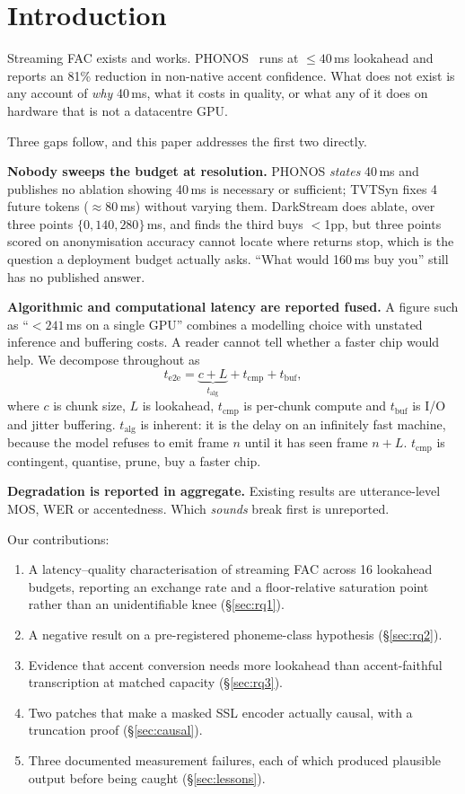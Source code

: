 \documentclass[9pt,a4paper,twocolumn]{article}
\newcommand{\talg}{\ensuremath{t_{\mathrm{alg}}}}
\newcommand{\tcmp}{\ensuremath{t_{\mathrm{cmp}}}}
\newcommand{\tbuf}{\ensuremath{t_{\mathrm{buf}}}}
\begin{document}
\section{Introduction}

Streaming FAC exists and works. PHONOS~\cite{phonos2026} runs at
${\leq}40$\,ms lookahead and reports an 81\% reduction in non-native accent
confidence. What does not exist is any account of \emph{why} 40\,ms, what it
costs in quality, or what any of it does on hardware that is not a datacentre
GPU.

Three gaps follow, and this paper addresses the first two directly.

\textbf{Nobody sweeps the budget at resolution.} PHONOS \emph{states} 40\,ms
and publishes no ablation showing 40\,ms is necessary or sufficient; TVTSyn
fixes 4 future tokens ($\approx$80\,ms) without varying them. DarkStream does
ablate, over three points $\{0, 140, 280\}$\,ms, and finds the third buys
$<$1pp, but three points scored on anonymisation accuracy cannot locate
where returns stop, which is the question a deployment budget actually asks.
``What would 160\,ms buy you'' still has no published answer.

\textbf{Algorithmic and computational latency are reported fused.} A figure
such as ``${<}241$\,ms on a single GPU'' combines a modelling choice with
unstated inference and buffering costs. A reader cannot tell whether a faster
chip would help. We decompose throughout as
\begin{equation}
t_{\mathrm{e2e}} = \underbrace{c + L}_{t_{\mathrm{alg}}} + t_{\mathrm{cmp}} + t_{\mathrm{buf}},
\label{eq:decomp}
\end{equation}
where $c$ is chunk size, $L$ is lookahead, \tcmp{} is per-chunk compute and
\tbuf{} is I/O and jitter buffering. \talg{} is inherent: it is the delay on an
infinitely fast machine, because the model refuses to emit frame $n$ until it
has seen frame $n{+}L$. \tcmp{} is contingent, quantise, prune, buy a faster
chip.

\textbf{Degradation is reported in aggregate.} Existing results are
utterance-level MOS, WER or accentedness. Which \emph{sounds} break first is
unreported.

Our contributions:
\begin{enumerate}\itemsep1pt
\item A latency--quality characterisation of streaming FAC across 16 lookahead
      budgets, reporting an exchange rate and a floor-relative saturation
      point rather than an unidentifiable knee (\S\ref{sec:rq1}).
\item A negative result on a pre-registered phoneme-class hypothesis
      (\S\ref{sec:rq2}).
\item Evidence that accent conversion needs more lookahead than
      accent-faithful transcription at matched capacity (\S\ref{sec:rq3}).
\item Two patches that make a masked SSL encoder actually causal, with a
      truncation proof (\S\ref{sec:causal}).
\item Three documented measurement failures, each of which produced plausible
      output before being caught (\S\ref{sec:lessons}).
\end{enumerate}
\end{document}
